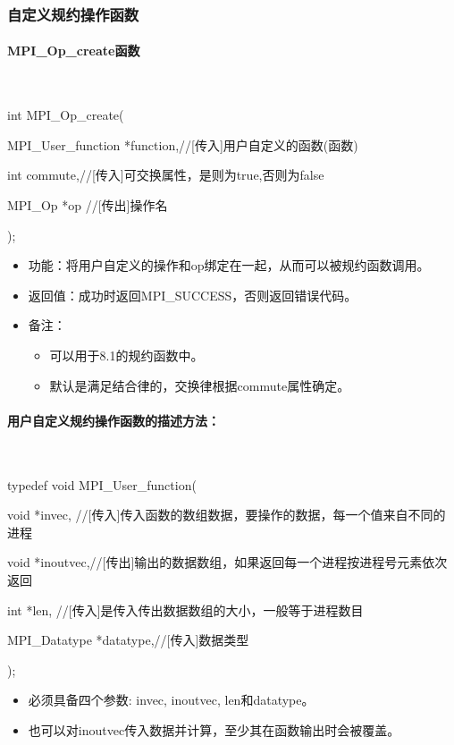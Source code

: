 \documentclass[UTF8]{article}%
\begin{document}
\subsubsection{自定义规约操作函数}

\paragraph{MPI\_Op\_create函数}~{}

int MPI\_Op\_create(
    
    \qquad MPI\_User\_function *function,//[传入]用户自定义的函数(函数)

    \qquad int commute,//[传入]可交换属性，是则为true,否则为false

    \qquad MPI\_Op *op //[传出]操作名
    
);

\begin{itemize}
    \item 功能：将用户自定义的操作和op绑定在一起，从而可以被规约函数调用。
    \item 返回值：成功时返回MPI\_SUCCESS，否则返回错误代码。
    \item 备注：
    
    {
        \begin{itemize}
            \item 可以用于8.1的规约函数中。
            \item 默认是满足结合律的，交换律根据commute属性确定。
        \end{itemize}
    }

\end{itemize}

\paragraph{用户自定义规约操作函数的描述方法：}~{}

typedef void MPI\_User\_function(
    
    \qquad void *invec, //[传入]传入函数的数组数据，要操作的数据，每一个值来自不同的进程

    \qquad void *inoutvec,//[传出]输出的数据数组，如果返回每一个进程按进程号元素依次返回

    \qquad int *len, //[传入]是传入传出数据数组的大小，一般等于进程数目

    \qquad MPI\_Datatype *datatype,//[传入]数据类型
  
);

\begin{itemize}
    \item 必须具备四个参数: invec, inoutvec, len和datatype。
    \item 也可以对inoutvec传入数据并计算，至少其在函数输出时会被覆盖。
\end{itemize}
\end{document}

